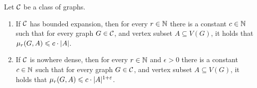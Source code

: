\begin{lemma}\label{lem:projection-complexity}
Let $\mathcal{C}$ be a class of graphs. 
\begin{enumerate}
\item If $\mathcal{C}$ has bounded expansion, then for every $r\in \mathbb{N}$ there is 
  a constant $c\in\mathbb{N}$ such that for every graph $G\in \mathcal{C}$, and vertex subset $A\subseteq V(G)$, 
  it holds that $\mu_r(G,A)\leqslant c\cdot |A|$.
  \item If $\mathcal{C}$ is nowhere dense, then for every $r\in \mathbb{N}$ and $\epsilon>0$ there is 
  a constant $c\in \mathbb{N}$ such that for every graph $G\in \mathcal{C}$, and vertex subset $A\subseteq V(G)$, 
  it holds that $\mu_r(G,A)\leqslant c\cdot |A|^{1+\varepsilon}$.
\end{enumerate}
\end{lemma}



